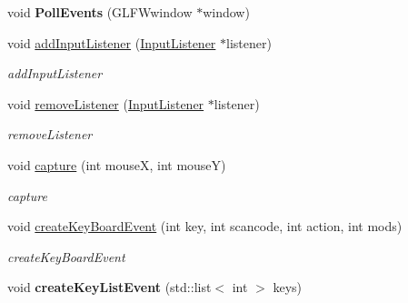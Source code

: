 \begin{DoxyCompactItemize}
\item 
\hypertarget{classEngine_1_1InputManager_aad9dc1be66eb9e4aa297f05d6f52796f}{}void {\bfseries Poll\+Events} (G\+L\+F\+Wwindow $\ast$window)\label{classEngine_1_1InputManager_aad9dc1be66eb9e4aa297f05d6f52796f}

\item 
void \hyperlink{classEngine_1_1InputManager_a2173a6568e83a87457dea29d6a2cbcfa}{add\+Input\+Listener} (\hyperlink{classEngine_1_1InputListener}{Input\+Listener} $\ast$listener)
\begin{DoxyCompactList}\small\item\em add\+Input\+Listener \end{DoxyCompactList}\item 
void \hyperlink{classEngine_1_1InputManager_afa38a27cafb58cdaf0b961b62a4ccb5a}{remove\+Listener} (\hyperlink{classEngine_1_1InputListener}{Input\+Listener} $\ast$listener)
\begin{DoxyCompactList}\small\item\em remove\+Listener \end{DoxyCompactList}\item 
void \hyperlink{classEngine_1_1InputManager_a831f77f0da50898510e384b6551c7526}{capture} (int mouse\+X, int mouse\+Y)
\begin{DoxyCompactList}\small\item\em capture \end{DoxyCompactList}\item 
void \hyperlink{classEngine_1_1InputManager_a519d703bd33f1bb168e758f7938279dd}{create\+Key\+Board\+Event} (int key, int scancode, int action, int mods)
\begin{DoxyCompactList}\small\item\em create\+Key\+Board\+Event \end{DoxyCompactList}\item 
\hypertarget{classEngine_1_1InputManager_aa58b9b680a69eac6c3fd26ef6a480110}{}void {\bfseries create\+Key\+List\+Event} (std\+::list$<$ int $>$ keys)\label{classEngine_1_1InputManager_aa58b9b680a69eac6c3fd26ef6a480110}


\end{DoxyCompactItemize}
